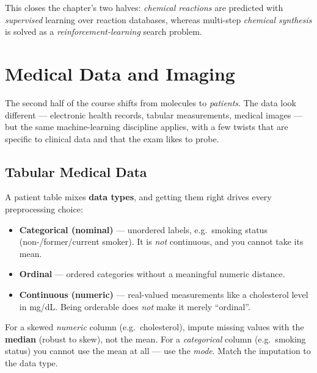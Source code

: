 \documentclass[11pt, oneside]{book}
\begin{document}
This closes the chapter's two halves: \emph{chemical reactions} are predicted with
\emph{supervised} learning over reaction databases, whereas multi-step \emph{chemical
synthesis} is solved as a \emph{reinforcement-learning} search problem.








\chapter{Medical Data and Imaging}
\label{chap:medical}

The second half of the course shifts from molecules to \emph{patients}. The data
look different --- electronic health records, tabular measurements, medical images
--- but the same machine-learning discipline applies, with a few twists that are
specific to clinical data and that the exam likes to probe.

\section{Tabular Medical Data}

A patient table mixes \textbf{data types}, and getting them right drives every
preprocessing choice:

\begin{itemize}
  \item \textbf{Categorical (nominal)} --- unordered labels, e.g.\ smoking status
        (non-/former/current smoker). It is \emph{not} continuous, and you cannot
        take its mean.
  \item \textbf{Ordinal} --- ordered categories without a meaningful numeric
        distance.
  \item \textbf{Continuous (numeric)} --- real-valued measurements like a cholesterol
        level in mg/dL. Being orderable does \emph{not} make it merely ``ordinal''.
\end{itemize}

\begin{notebox}[title={Imputing missing values}]
For a skewed \emph{numeric} column (e.g.\ cholesterol), impute missing values with
the \textbf{median} (robust to skew), not the mean. For a \emph{categorical} column
(e.g.\ smoking status) you cannot use the mean at all --- use the \emph{mode}. Match
the imputation to the data type.
\end{notebox}
\end{document}
